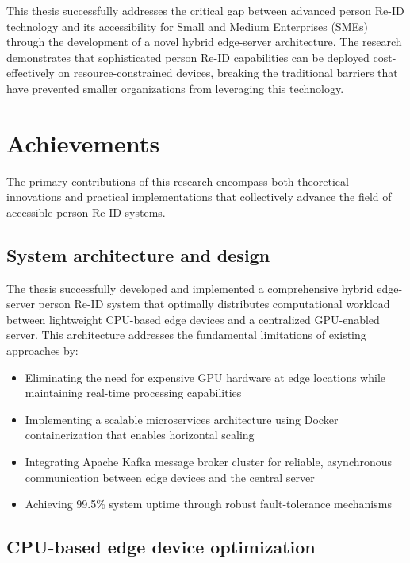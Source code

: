 \documentclass[../main.tex]{subfiles}
\begin{document}
This thesis successfully addresses the critical gap between advanced person Re-ID technology and its accessibility for Small and Medium Enterprises (SMEs) through the development of a novel hybrid edge-server architecture. The research demonstrates that sophisticated person Re-ID capabilities can be deployed cost-effectively on resource-constrained devices, breaking the traditional barriers that have prevented smaller organizations from leveraging this technology.

\section{Achievements}

The primary contributions of this research encompass both theoretical innovations and practical implementations that collectively advance the field of accessible person Re-ID systems.

\subsection{System architecture and design}

The thesis successfully developed and implemented a comprehensive hybrid edge-server person Re-ID system that optimally distributes computational workload between lightweight CPU-based edge devices and a centralized GPU-enabled server. This architecture addresses the fundamental limitations of existing approaches by:

\begin{itemize}
    \item Eliminating the need for expensive GPU hardware at edge locations while maintaining real-time processing capabilities
    \item Implementing a scalable microservices architecture using Docker containerization that enables horizontal scaling
    \item Integrating Apache Kafka message broker cluster for reliable, asynchronous communication between edge devices and the central server
    \item Achieving 99.5\% system uptime through robust fault-tolerance mechanisms
\end{itemize}

\subsection{CPU-based edge device optimization}
\end{document}
